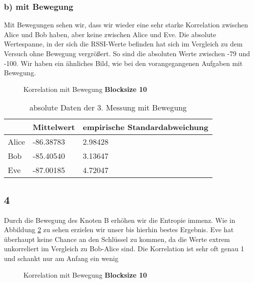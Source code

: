 \documentclass[12pt,a4paper]{article}
\begin{document}
\subsubsection*{b) mit Bewegung}
Mit Bewegungen sehen wir, dass wir wieder eine sehr starke Korrelation zwischen Alice und Bob haben, aber keine zwischen Alice und Eve. Die absolute Wertespanne, in der sich die RSSI-Werte befinden hat sich im Vergleich zu dem Versuch ohne Bewegung vergrößert. So sind die absoluten Werte zwischen -79 und -100. Wir haben ein ähnliches Bild, wie bei den vorangegangenen Aufgaben mit Bewegung. 
\begin{figure}[H]
\centering
{} \qquad
{}
\caption{Korrelation mit Bewegung \textbf{Blocksize 10}}
\label{fig:3_b_m}
\end{figure}

\begin{table}[H]
\centering
\begin{tabular}{l|l|l}
& Mittelwert & empirische Standardabweichung \\
\hline
Alice & -86.38783 & 2.98428 \\
\hline
Bob & -85.40540 & 3.13647 \\
\hline
Eve & -87.00185 & 4.72047 \\
\end{tabular}
\caption{absolute Daten der 3. Messung mit Bewegung}
\end{table}

\subsection*{4}
Durch die Bewegung des Knoten B erhöhen wir die Entropie immenz. Wie in Abbildung \ref{fig:4} zu sehen erzielen wir unser bis hierhin bestes Ergebnis. Eve hat überhaupt keine Chance an den Schlüssel zu kommen, da die Werte extrem unkorreliert im Vergleich zu Bob-Alice sind. Die Korrelation ist sehr oft genau 1 und schankt nur am Anfang ein wenig
\begin{figure}[H]
\centering
{} \qquad
{}
\caption{Korrelation mit Bewegung \textbf{Blocksize 10}}
\label{fig:4}
\end{figure}
\end{document}
